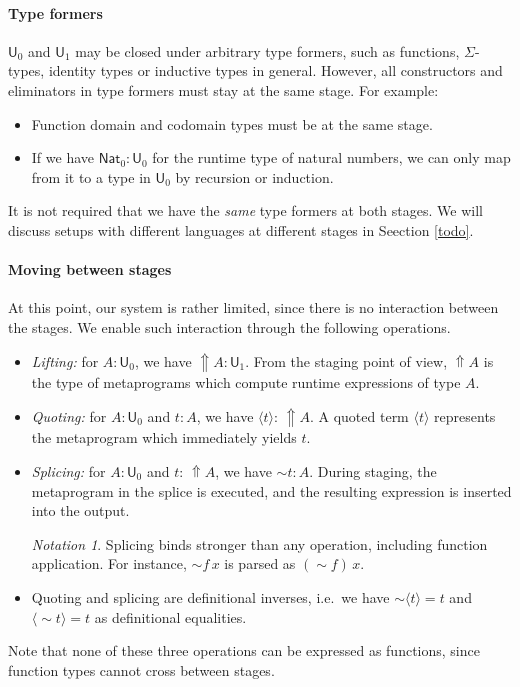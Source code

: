 \documentclass[acmsmall]{acmart}
\newcommand{\msf}[1]{\mathsf{#1}}
\newcommand{\Lift}{{\Uparrow}}
\newcommand{\spl}{{\sim}}
\newcommand{\qut}[1]{\langle #1\rangle}
\renewcommand{\U}{\msf{U}}
\newcommand{\Nat}{\msf{Nat}}
\theoremstyle{remark}
\newtheorem{notation}{Notation}
\begin{document}
\paragraph{Type formers} $\U_0$ and $\U_1$ may be closed under arbitrary type formers,
such as functions, $\Sigma$-types, identity types or inductive types in general.
However, all constructors and eliminators in type formers must stay at the same
stage. For example:
\begin{itemize}
  \item Function domain and codomain types must be at the same stage.
  \item If we have $\Nat_0 : \U_0$ for the runtime type of natural numbers,
        we can only map from it to a type in $\U_0$ by recursion or induction.
\end{itemize}
It is not required that we have the \emph{same} type formers at both stages. We
will discuss setups with different languages at different stages in Seection
\ref{todo}.

\paragraph{Moving between stages}
At this point, our system is rather limited, since there is no interaction
between the stages. We enable such interaction through the following operations.
\begin{itemize}
\item \emph{Lifting:} for $A : \U_0$, we have $\Lift A : \U_1$.  From the
  staging point of view, $\Lift A$ is the type of metaprograms which compute
  runtime expressions of type $A$.
\item \emph{Quoting:} for $A : \U_0$ and $t : A$, we have $\qut{t} :\,\Lift A$.
  A quoted term $\qut{t}$ represents the metaprogram which immediately yields
  $t$.
\item \emph{Splicing:} for $A : \U_0$ and $t :\,\Lift A$, we have $\spl t : A$.
  During staging, the metaprogram in the splice is executed, and the resulting
  expression is inserted into the output.
  \begin{notation} Splicing binds stronger than any operation, including function
    application. For instance, $\spl f\,x$ is parsed as $(\spl f)\,x$.
  \end{notation}

\item Quoting and splicing are definitional inverses, i.e.\ we have $\spl\qut{t} = t$ and
  $\qut{\spl t}=t$ as definitional equalities.
\end{itemize}
Note that none of these three operations can be expressed as functions, since
function types cannot cross between stages.
\end{document}
